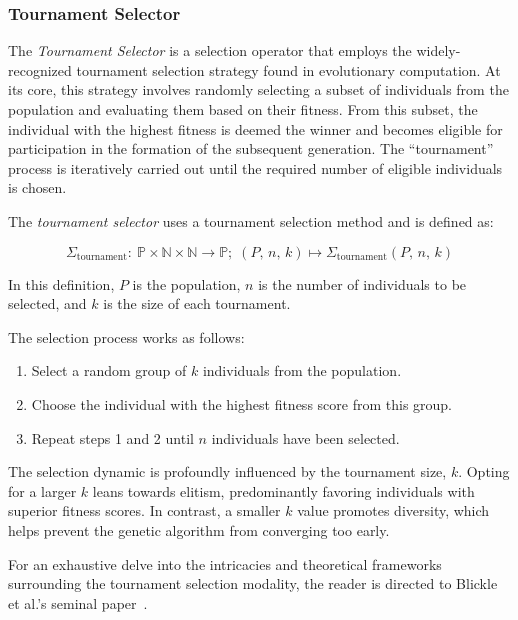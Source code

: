 \subsubsection{Tournament Selector}
\label{sec:keen:operators:selection:tournament}
  The \emph{Tournament Selector} is a selection operator that employs the 
  widely-recognized tournament selection strategy found in evolutionary 
  computation.
  At its core, this strategy involves randomly selecting a subset of 
  individuals from the population and evaluating them based on their fitness. 
  From this subset, the individual with the highest fitness is deemed the 
  winner and becomes eligible for participation in the formation of the 
  subsequent generation.
  The \enquote{tournament} process is iteratively carried out until the 
  required number of eligible individuals is chosen.

  \begin{definition}
    \label{def:keen:op:select:tournament}
      The \emph{tournament selector} uses a tournament selection method and is defined as:
  
      \begin{equation}
        \Sigma_\mathrm{tournament} :\: 
          \mathbb{P} \times \mathbb{N} \times \mathbb{N} \to \mathbb{P};\;
        (P,\, n,\, k) \mapsto \Sigma_\mathrm{tournament}(P,\, n,\, k)
      \end{equation}
  
      In this definition, \(P\) is the population, \(n\) is the number of individuals to be selected, and \(k\) is the size of each tournament.
  
      The selection process works as follows:
  
      \begin{enumerate}
        \item Select a random group of \(k\) individuals from the population.
        \item Choose the individual with the highest fitness score from this group.
        \item Repeat steps 1 and 2 until \(n\) individuals have been selected.
      \end{enumerate}
    \end{definition}

  \begin{remark}
    The selection dynamic is profoundly influenced by the tournament size, 
    \(k\).
    Opting for a larger \(k\) leans towards elitism, predominantly favoring 
    individuals with superior fitness scores.
    In contrast, a smaller \(k\) value promotes diversity, which helps prevent the genetic algorithm from converging too early.
  \end{remark}

  For an exhaustive delve into the intricacies and theoretical frameworks 
  surrounding the tournament selection modality, the reader is directed to 
  Blickle et al.'s seminal 
  paper~\autocite{blickleMathematicalAnalysisTournament1995}.

